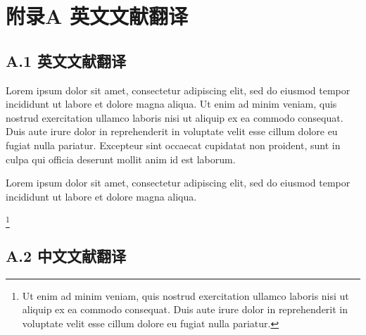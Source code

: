 
\chapter*{附录A 英文文献翻译}

\section*{A.1 英文文献翻译}
Lorem ipsum dolor sit amet, consectetur adipiscing elit, sed do eiusmod tempor
incididunt ut labore et dolore magna aliqua.
Ut enim ad minim veniam, quis nostrud exercitation ullamco laboris nisi ut
aliquip ex ea commodo consequat.
Duis aute irure dolor in reprehenderit in voluptate velit esse cillum dolore eu
fugiat nulla pariatur.
Excepteur sint occaecat cupidatat non proident, sunt in culpa qui officia
deserunt mollit anim id est laborum.

Lorem ipsum dolor sit amet, consectetur adipiscing elit, sed do eiusmod tempor
incididunt ut labore et dolore magna aliqua.


\footnote{Ut enim ad minim veniam, quis nostrud exercitation ullamco laboris
  nisi ut aliquip ex ea commodo consequat.
  Duis aute irure dolor in reprehenderit in voluptate velit esse cillum dolore
  eu fugiat nulla pariatur.}


  \section*{A.2 中文文献翻译}
